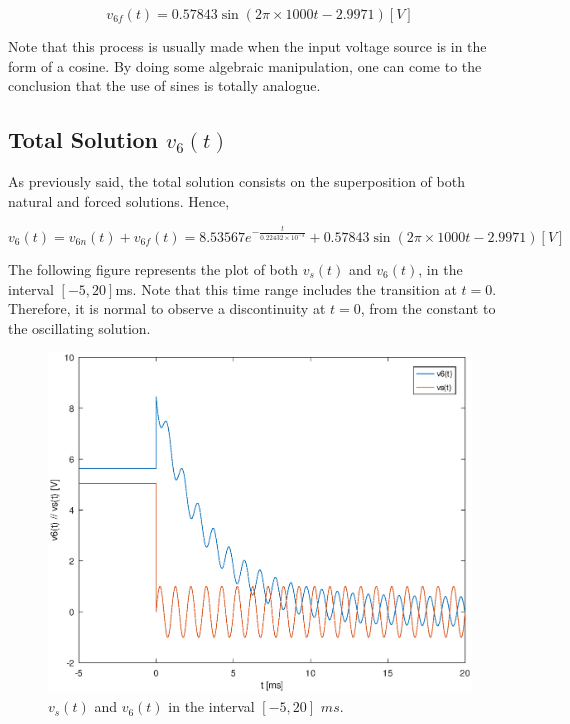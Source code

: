 \begin{equation}
  \label{eq10}
   v_{6f}(t)=0.57843\sin(2\pi \times 1000t - 2.9971) [V]
\end{equation}

\par Note that this process is usually made when the input voltage source is in the form of a cosine. By doing some algebraic manipulation, one can come to the conclusion that the use of sines is totally analogue.

\vspace{5mm}
\subsection{Total Solution $v_6(t)$}

\vspace{5mm}
\par As previously said, the total solution consists on the superposition of both natural and forced solutions. Hence,

\begin{equation}
v_6(t)=v_{6n}(t)+v_{6f}(t)=8.53567e^{-\frac{t}{0.22432 \times 10^{-3}}}+0.57843\sin(2\pi \times 1000t - 2.9971) [V]
\end{equation}

\vspace{3mm}
\par The following figure represents the plot of both $v_s(t)$ and $v_6(t)$, in the interval $[-5,20]$ms. Note that this time range includes the transition at $t=0$. Therefore, it is normal to observe a discontinuity at $t=0$, from the constant to the oscillating solution.


\begin{figure}[h]
     \centering
         \includegraphics[scale = 0.7]{v6t.eps}
         \caption{$v_s(t)$ and $v_{6}(t)$ in the interval $[-5, 20]$ $ms$.}
     \label{v6t}
 \end{figure}
 \vspace{5mm}


